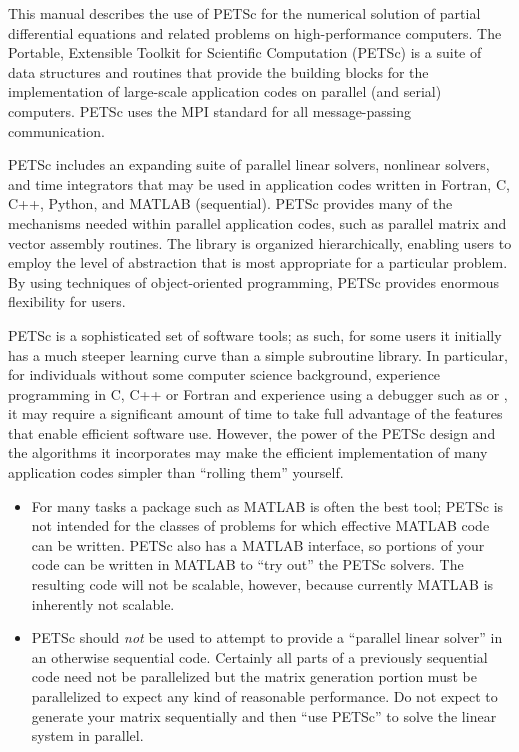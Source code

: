 
%
%

\medskip \medskip
This manual describes the use of PETSc for the numerical solution
of partial differential equations and related problems
on high-performance computers.  The
Portable, Extensible Toolkit for Scientific Computation (PETSc) is a
suite of data structures and routines that provide the building
blocks for the implementation of large-scale application codes on parallel
(and serial) computers.  PETSc uses the MPI standard for all
message-passing communication.

PETSc includes an expanding suite of parallel linear solvers, nonlinear
solvers, and time integrators that may be
used in application codes written in Fortran, C, C++, Python, and MATLAB (sequential).  PETSc
provides many of the mechanisms needed within parallel application
codes, such as parallel matrix and vector assembly routines. The library is
organized hierarchically, enabling users to employ the level of
abstraction that is most appropriate for a particular problem. By
using techniques of object-oriented programming, PETSc provides
enormous flexibility for users.

PETSc is a sophisticated set of software tools; as such, for some
users it initially has a much steeper learning curve than a simple
subroutine library. In particular, for individuals without some
computer science background, experience programming in C, C++ or Fortran and experience using a debugger such as  or , it
may require a significant amount of time to take full advantage of the
features that enable efficient software use.  However, the power of
the PETSc design and the algorithms it incorporates may make the efficient
implementation of many application codes simpler than ``rolling
them'' yourself.
\begin{itemize}
\item  For many tasks a package such as MATLAB is often the best tool; PETSc is not
intended for the classes of problems for which effective MATLAB code
can be written. PETSc also has a MATLAB interface, so portions of your code can be written in MATLAB to ``try out'' the PETSc solvers.
The resulting code will not be scalable, however, because currently MATLAB is inherently not scalable.
\item PETSc should {\em not} be used to attempt to provide
a ``parallel linear solver'' in an otherwise sequential code.
Certainly all parts of a previously sequential code need not be parallelized but the
matrix generation portion must be parallelized to expect any kind of reasonable performance.
Do not expect to generate your matrix sequentially and then ``use PETSc'' to solve
the linear system in parallel.
\end{itemize}

